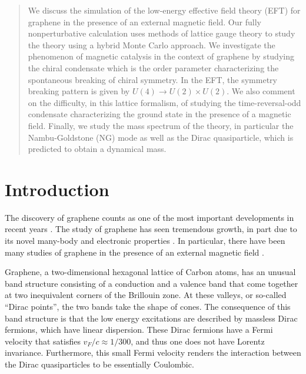 \documentclass[aps,prd,twocolumn,showpacs,superscriptaddress,groupedaddress]{revtex4}  %
\begin{document}
\begin{abstract}
We discuss the simulation of the low-energy effective field theory (EFT) for graphene in the presence of an external magnetic field. Our fully nonperturbative calculation 
uses methods of lattice gauge theory to study the theory using a hybrid Monte Carlo approach. We investigate the phenomenon of magnetic catalysis in the context of graphene by studying
the chiral condensate which is the order parameter characterizing the spontaneous breaking of chiral symmetry. In the EFT, the symmetry breaking pattern is given by $U(4) \to U(2) \times U(2)$. We also comment on the difficulty, in this lattice formalism, of studying the time-reversal-odd condensate characterizing the ground state in the presence of a magnetic field.
Finally, we study the mass spectrum of the theory, in particular the Nambu-Goldstone (NG) mode as well as the Dirac quasiparticle, which is predicted to obtain a dynamical mass. 
\end{abstract}

\maketitle

\section{\label{sec:Intro}Introduction}
The discovery of graphene counts as one of the most important developments in recent years \cite{Novoselov}. The study of graphene has seen tremendous growth,
in part due to its novel many-body and electronic properties \cite{CastroNeto}. In particular, there have been many studies of graphene
in the presence of an external magnetic field \cite{Goerbig}.

Graphene, a two-dimensional hexagonal lattice of Carbon atoms, has an unusual band structure consisting of a conduction and a valence band that come together at two inequivalent corners 
of the Brillouin zone. At these valleys, or so-called ``Dirac points'', the two bands take the shape of cones. The consequence of this band structure is that the low energy excitations are described by massless Dirac fermions, which have linear dispersion.
These Dirac fermions have a Fermi velocity that satisfies $v_F/c \approx 1/300$, and thus one does not have Lorentz invariance. Furthermore, this small Fermi velocity renders the interaction between the Dirac quasiparticles 
to be essentially Coulombic. 
\end{document}
